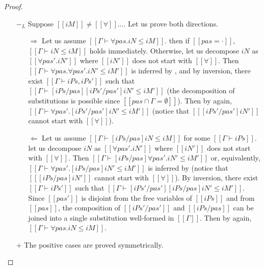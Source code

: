 \begin{proof}
\begin{itemize}
\begin{itemize}
      \end{itemize}
    \item [$-_{L}$] Suppose $[[iM]] \neq [[∀]]\dots$. Let us prove both directions.
      \begin{itemize}
        \item [$\Rightarrow$] Let us assume $[[Γ ⊢ ∀pas.iN ≤ iM]]$.
          then if $[[pas = ·]]$, $[[Γ ⊢ iN ≤ iM]]$ holds immediately.
          Otherwise, let us decompose  $iN$ as $[[∀pas'.iN']]$ where 
          $[[iN']]$ does not start with $[[∀]]$.
          Then $[[Γ ⊢ ∀pas.∀pas'.iN' ≤ iM']]$ is inferred by
          ,
          and by inversion, 
          there exist $[[Γ ⊢ iPs,iPs']]$ 
          such that $[[Γ ⊢ [iPs/pas][iPs'/pas']iN' ≤ iM']]$ 
          (the decomposition of substitutions is possible since $[[{pas} ∩ {Γ} = ∅]]$).
          Then by  again,
          $[[Γ ⊢ ∀pas'.[iPs'/pas']iN' ≤ iM']]$ (notice that $[[ [iPs'/pas']iN' ]]$ cannot
          start with $[[∀]]$).
        \item [$\Leftarrow$] Let us assume 
          $[[Γ ⊢ [iPs/pas]iN ≤ iM]]$ for some $[[Γ ⊢ iPs]]$.
          let us decompose $iN$ as $[[∀pas'.iN']]$ where $[[iN']]$ does not start with $[[∀]]$.
          Then $[[Γ ⊢ [iPs/pas]∀pas'.iN' ≤ iM']]$ or, equivalently,
          $[[Γ ⊢ ∀pas'.[iPs/pas]iN' ≤ iM']]$ is inferred by 
          (notice that $[[ [iPs/pas]iN' ]]$ cannot start with $[[∀]]$).
          By inversion, there exist $[[Γ ⊢ iPs']]$ such that 
          $[[Γ ⊢ [iPs'/pas'][iPs/pas]iN' ≤ iM']]$. Since $[[pas']]$ is disjoint
          from the free variables of $[[iPs]]$ and from $[[pas]]$, the composition of 
          $[[iPs'/pas']]$ and $[[iPs/pas]]$ can be joined into a single substitution
          well-formed in $[[Γ]]$. Then by  again,
          $[[Γ ⊢ ∀pas.iN ≤ iM]]$.
      \end{itemize}
      \item [$+$] The positive cases are proved symmetrically.
  \end{itemize}
\end{proof}

